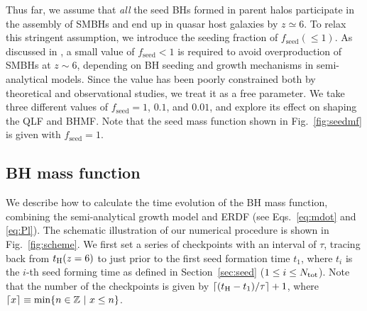\documentclass[twocolumn, twocolappendix]{aastex63}
\newcommand{\tlife}{\tau}
\newcommand{\fseed}{f_\mathrm{seed}}
\begin{document}
\begin{CJK*}{UTF8}{gbsn}
Thus far, we assume that {\it all} the seed BHs formed in parent halos participate in the assembly of SMBHs and 
end up in quasar host galaxies by $z\simeq 6$.
To relax this stringent assumption, we introduce the seeding fraction of $\fseed (\leq 1)$.
As discussed in \citet{2009ApJ...696.1798T}, a small value of $\fseed <1$ is required to avoid overproduction of SMBHs at $z\sim 6$,
depending on BH seeding and growth mechanisms in semi-analytical models.
Since the value has been poorly constrained both by theoretical and observational studies, we treat it as a free parameter.
We take three different values of $\fseed = 1$, $0.1$, and $0.01$, and explore its effect on shaping the QLF and BHMF.
Note that the seed mass function shown in Fig.~\ref{fig:seedmf} is given with $\fseed = 1$.


\vspace{2mm}
\subsection{BH mass function}\label{sec:MF}

We describe how to calculate the time evolution of the BH mass function, 
combining the semi-analytical growth model and ERDF (see Eqs.~\ref{eq:mdot} and \ref{eq:Pl}).
The schematic illustration of our numerical procedure is shown in Fig.~\ref{fig:scheme}. 
We first set a series of checkpoints with an interval of $\tlife$, 
tracing back from $t_{\rm H}(z=6)$ to just prior to the first seed formation time $t_1$, where $t_i$ is the $i$-th seed forming time
as defined in Section~\ref{sec:seed} ($1\leq i\leq N_{\rm tot}$).
Note that the number of the checkpoints is given by $\lceil (t_{\rm H}-t_1)/\tau \rceil+1$, where $\lceil x\rceil \equiv {\rm min}\{n \in \mathbb{Z}~ |~x\leq n\}$.



\end{CJK*}
\end{document}

